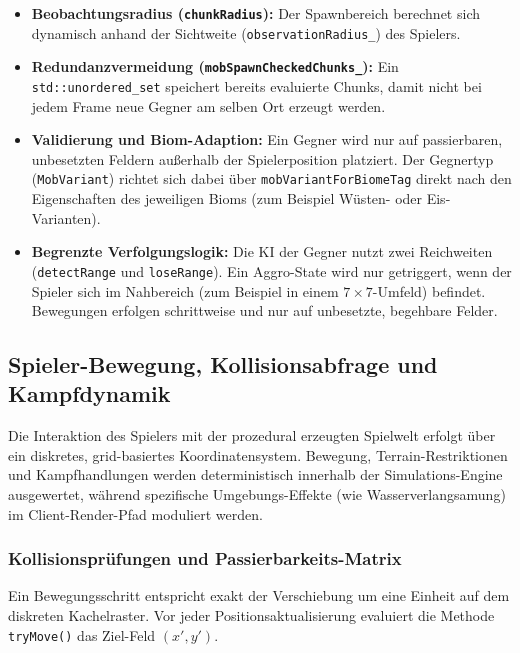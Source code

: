 \documentclass[
  a4paper,
  11pt,
  twoside,
  BCOR=8mm,           %
  headings=big,
  numbers=noenddot,
  listof=totoc,       %
  captions=tableheading,
]{scrreprt}
\begin{document}
\begin{itemize}
    \item \textbf{Beobachtungsradius (\texttt{chunkRadius}):} Der Spawnbereich berechnet sich dynamisch anhand der Sichtweite (\texttt{observationRadius\_}) des Spielers.
    \item \textbf{Redundanzvermeidung (\texttt{mobSpawnCheckedChunks\_}):} Ein \texttt{std::unordered\_set} speichert bereits evaluierte Chunks, damit nicht bei jedem Frame neue Gegner am selben Ort erzeugt werden.
    \item \textbf{Validierung und Biom-Adaption:} Ein Gegner wird nur auf passierbaren, unbesetzten Feldern außerhalb der Spielerposition platziert. Der Gegnertyp (\texttt{MobVariant}) richtet sich dabei über \texttt{mobVariantForBiomeTag} direkt nach den Eigenschaften des jeweiligen Bioms (zum Beispiel Wüsten- oder Eis-Varianten).
    \item \textbf{Begrenzte Verfolgungslogik:} Die KI der Gegner nutzt zwei Reichweiten (\texttt{detectRange} und \texttt{loseRange}). Ein Aggro-State wird nur getriggert, wenn der Spieler sich im Nahbereich (zum Beispiel in einem $7 \times 7$-Umfeld) befindet. Bewegungen erfolgen schrittweise und nur auf unbesetzte, begehbare Felder.
\end{itemize}

\subsection{Spieler-Bewegung, Kollisionsabfrage und Kampfdynamik}
\label{sec:umsetzung_movement_combat}

Die Interaktion des Spielers mit der prozedural erzeugten Spielwelt erfolgt über ein diskretes, grid-basiertes Koordinatensystem. Bewegung, Terrain-Restriktionen und Kampfhandlungen werden deterministisch innerhalb der Simulations-Engine ausgewertet, während spezifische Umgebungs-Effekte (wie Wasserverlangsamung) im Client-Render-Pfad moduliert werden.

\subsubsection{Kollisionsprüfungen und Passierbarkeits-Matrix}
Ein Bewegungsschritt entspricht exakt der Verschiebung um eine Einheit auf dem diskreten Kachelraster. Vor jeder Positionsaktualisierung evaluiert die Methode \texttt{tryMove()} das Ziel-Feld $(x', y')$.
\end{document}
